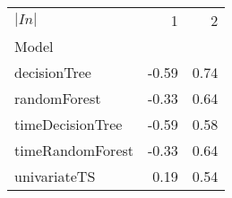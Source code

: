 \begin{tabular}{lrr}
\toprule
$|In|$ & 1 & 2 \\
Model &  &  \\
\midrule
decisionTree & -0.59 & 0.74 \\
randomForest & -0.33 & 0.64 \\
timeDecisionTree & -0.59 & 0.58 \\
timeRandomForest & -0.33 & 0.64 \\
univariateTS & 0.19 & 0.54 \\
\bottomrule
\end{tabular}
